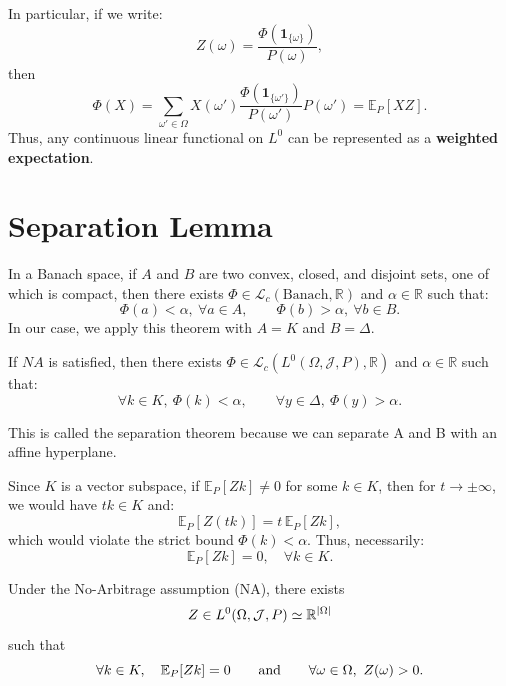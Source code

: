 In particular, if we write:
\[
Z(\omega) = \frac{\Phi(\mathbf{1}_{\{\omega\}})}{P(\omega)},
\]
then
\[
\Phi(X) = \sum_{\omega' \in \Omega} X(\omega') \frac{\Phi(\mathbf{1}_{\{\omega'\}})}{P(\omega')} P(\omega')
= \mathbb{E}_P[X Z].
\]
Thus, any continuous linear functional on $L^0$ can be represented as a \textbf{weighted expectation}.


\section{Separation Lemma}

\begin{theorem}
In a Banach space, if $A$ and $B$ are two convex, closed, and disjoint sets, one of which is compact,  
then there exists $\Phi \in \mathcal{L}_c(\text{Banach}, \mathbb{R})$ and $\alpha \in \mathbb{R}$ such that:
\[
\Phi(a) < \alpha,\ \forall a \in A, \qquad \Phi(b) > \alpha,\ \forall b \in B.
\]
In our case, we apply this theorem with $A = K$ and $B = \Delta$.
\end{theorem}

\begin{lemma} \label{lem:6}
If $NA$ is satisfied, then there exists $\Phi \in \mathcal{L}_c(L^0(\Omega, \mathcal{J}, P), \mathbb{R})$ and $\alpha \in \mathbb{R}$ such that:
\begin{equation}
\forall k \in K,\ \Phi(k) < \alpha, \qquad \forall y \in \Delta,\ \Phi(y) > \alpha.
\end{equation}
\end{lemma}

\begin{remark}
\item This is called the separation theorem because we can separate A and B with an affine hyperplane.
\item Since $K$ is a vector subspace, if $\mathbb{E}_P[Zk] \neq 0$ for some $k \in K$,  
then for $t \to \pm\infty$, we would have $tk \in K$ and:
\[
\mathbb{E}_P[Z(tk)] = t \, \mathbb{E}_P[Zk],
\]
which would violate the strict bound $\Phi(k) < \alpha$.  
Thus, necessarily:
\[
\mathbb{E}_P[Zk] = 0,\quad \forall k \in K.
\]
\end{remark}


\begin{lemma}\label{lem:7}
Under the No-Arbitrage assumption (NA), there exists
\[
 Z\in L^0(\Omega,\mathcal{J},P)\simeq \mathbb{R}^{|\Omega|}
\]
such that
\begin{equation}
\forall k\in K,\quad \mathbb{E}_P[Zk]=0
\qquad\text{and}\qquad
\forall \omega\in\Omega,\ Z(\omega)>0 .
\end{equation}
\end{lemma}

